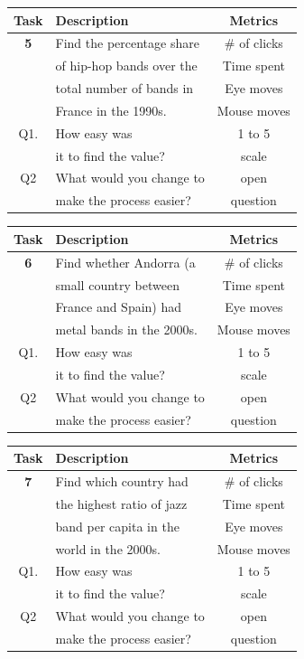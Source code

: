 \documentclass[twocolumn, letterpaper,13pt]{scrartcl}
\begin{document}
    \begin{center}
    \begin{tabular} { | c | l | c | }
    \hline
     Task & Description & Metrics \\
    \hline
    \textbf{5} & Find the percentage share & \# of clicks \\
    & of hip-hop bands over the & Time spent\\
    & total number of bands in & Eye moves\\
    & France in the 1990s. & Mouse moves\\
    \hline
    Q1. & How easy was & 1 to 5\\
    & it to find the value? & scale \\
    \hline
    Q2 & What would you change to & open\\
    & make the process easier? & question\\
    \hline
    \end{tabular}
    \end{center}
    
    \begin{center}
    \begin{tabular} { | c | l | c | }
    \hline
     Task & Description & Metrics \\
    \hline
    \textbf{6} & Find whether Andorra (a & \# of clicks \\
    & small country between & Time spent\\
    & France and Spain) had & Eye moves\\
    & metal bands in the 2000s.  & Mouse moves\\
    \hline
    Q1. & How easy was & 1 to 5\\
    & it to find the value? & scale \\
    \hline
    Q2 & What would you change to & open\\
    & make the process easier? & question\\
    \hline
    \end{tabular}
    \end{center}

    \begin{center}
    \begin{tabular} { | c | l | c | }
    \hline
     Task & Description & Metrics \\
    \hline
    \textbf{7} & Find which country had & \# of clicks \\
    & the highest ratio of jazz & Time spent\\
    & band per capita in the & Eye moves\\
    & world in the 2000s. & Mouse moves\\
    \hline
    Q1. & How easy was & 1 to 5\\
    & it to find the value? & scale \\
    \hline
    Q2 & What would you change to & open\\
    & make the process easier? & question\\
    \hline
    \end{tabular}
    \end{center}
    
\end{document}
